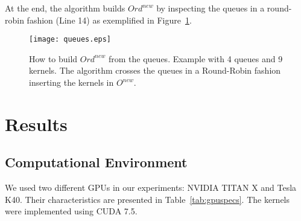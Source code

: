 \documentclass[conference]{IEEEtran}
\begin{document}
At the end, the algorithm builds $Ord^{new}$ by inspecting the queues in a round-robin fashion (Line 14) as exemplified in Figure~\ref{fig:queues}.



\begin{figure}[htb]
\centering
\texttt{[image: queues.eps]}
\caption{How to build $Ord^{new}$ from the queues. Example with 4 queues and 9 kernels. The algorithm crosses the queues in a Round-Robin fashion inserting the kernels in $O^{new}$.}
\label{fig:queues}
\end{figure}


%







%







\section{Results}
\label{sec:Results}

\subsection{Computational Environment}

We used two different GPUs in our experiments: NVIDIA TITAN X and Tesla K40. Their characteristics are presented in Table~\ref{tab:gpuspecs}. 
The kernels were implemented using CUDA 7.5.
\end{document}
